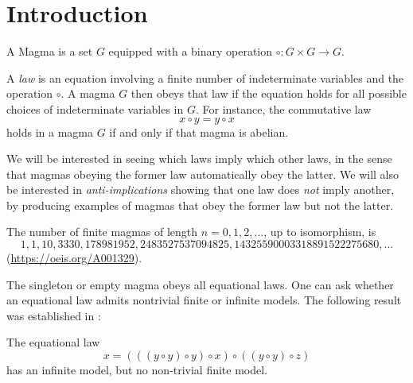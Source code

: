 \chapter{Introduction}

\begin{definition}\label{magma-def}\leanok A Magma is a set $G$ equipped with a binary operation $\circ: G \times G \to G$.
\end{definition}

A \emph{law} is an equation involving a finite number of indeterminate variables and the operation $\circ$.  A magma $G$ then obeys that law if the equation holds for all possible choices of indeterminate variables in $G$.  For instance, the commutative law
$$ x \circ y = y \circ x$$
holds in a magma $G$ if and only if that magma is abelian.

We will be interested in seeing which laws imply which other laws, in the sense that magmas obeying the former law automatically obey the latter.  We will also be interested in \emph{anti-implications} showing that one law does \emph{not} imply another, by producing examples of magmas that obey the former law but not the latter.

The number of finite magmas of length $n=0,1,2,\dots$, up to isomorphism, is
$$ 1, 1, 10, 3330, 178981952, 2483527537094825, 14325590003318891522275680, \dots$$
(\href{OEIS A001329}{https://oeis.org/A001329}).

The singleton or empty magma obeys all equational laws.  One can ask whether an equational law admits nontrivial finite or infinite models.  The following result was established in \cite{Kisielewicz}:

\begin{theorem}
  \leanok{}  The equational law
  \begin{equation}\label{biglaw}
     x = (((y \circ y) \circ y) \circ x) \circ ((y \circ y) \circ z)
  \end{equation}
has an infinite model, but no non-trivial finite model.
\end{theorem}

